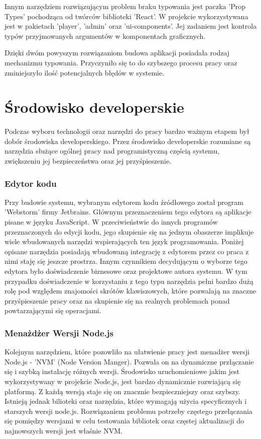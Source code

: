 Innym narzędziem rozwiązującym problem braku typowania jest paczka 'Prop Types' pochodząca od twórców biblioteki 'React'. W projekcie wykorzystywana jest w pakietach 'player', 'admin' oraz 'ui-components'. Jej zadaniem jest kontrola typów przyjmowanych argumentów w komponentach graficznych.

Dzięki dwóm powyszym rozwiązaniom budowa aplikacji posiadała rodzaj mechanizmu typowania. Przyczyniło się to do szybszego procesu pracy oraz zminiejszyło ilość potencjalnych błędów w systemie.

\section{Środowisko developerskie}
Podczas wyboru technologii oraz narzędzi do pracy bardzo ważnym etapem był dobór środowiska developerskiego. Przez środowisko developerskie rozumiane są narzędzia służące ogólnej pracy nad programistyczną częścią systemu, zwiększeniu jej bezpieczeństwa oraz jej przyśpieszenie.

\subsubsection{Edytor kodu}
Przy budowie systemu, wybranym edytorem kodu źródłowego został program 'Webstorm' firmy Jetbrains. Głównym przeznaczeniem tego edytora są aplikacje pisane w języku JavaScript. W przeciwieństwie do innych programów przeznaczonych do edycji kodu, jego skupienie się na jednym obaszerze implikuje wiele wbudowanych narzędzi wspierających ten język programowania. Poniżej opisane narzędzia posiadają wbudowaną integrację z edytorem przez co praca z nimi staję się jeszcze prostrza. Innym czynnikiem decydującym o wyborze tego edytora było doświadczenie biznesowe oraz projektowe autora systemu. W tym przypadku doświadczenie w korzystaniu z tego typu narzędzia pełni bardzo dużą rolę pod względem znajomości skrótów klawiszowych, które pozwalają na znaczne przyśpieszenie pracy oraz na skupienie się na realnych problemach ponad powtarzającymi się operacjami.


\subsubsection{Menażdżer Wersji Node.js}
Kolejnym narzędziem, które pozowliło na ułatwienie pracy jest menadżer wersji Node.js - 'NVM' (Node Version Manger).
Pozwala on na dynamiczne przłączanie się i szybką instalację różnych wersji. Środowisko uruchomieniowe jakim jest wykorzystywany w projekcie Node.js, jest bardzo dynamicznie rozwiającą się platformą. Z każdą wersją staje się on znacznie bezpieczniejszy oraz szybszy. Istnieją jednak bilioteki oraz narzędzia, które wymagają użycia specyficznych i starszych wersji node.js. Rozwiązaniem problemu potrzeby częstego przełączania się pomiędzy wersjami w celu testowania bibliotek oraz częstej aktualizacji do najnowszych wersji jest właśnie NVM. \cite{NVMDocs}

